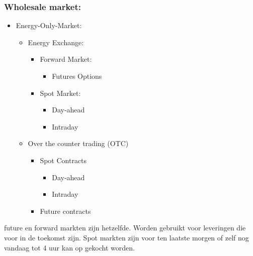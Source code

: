 \documentclass[12pt]{article}
\begin{document}
\subsubsection{Wholesale market:}
\begin{itemize}
    \item Energy-Only-Market:\begin{itemize}
        \item Energy Exchange:\begin{itemize}
            \item Forward Market:\begin{itemize}
                \item Futures Options
            \end{itemize}
            \item Spot Market:\begin{itemize}
                \item Day-ahead 
                \item Intraday
            \end{itemize}
        \end{itemize}
        \item Over the counter trading (OTC)\begin{itemize}
            \item Spot Contracts\begin{itemize}
                \item Day-ahead 
                \item Intraday
            \end{itemize}
            \item Future contracts
        \end{itemize}
    \end{itemize}
\end{itemize}
future en forward markten zijn hetzelfde. Worden gebruikt voor leveringen die voor in de toekomst zijn. Spot markten zijn voor ten laatste morgen of zelf nog vandaag tot 4 uur kan op gekocht worden.
\end{document}
